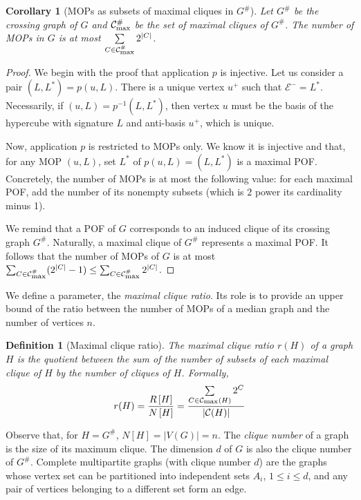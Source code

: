 \documentclass{article}
\newtheorem{definition}{Definition}
\newtheorem{corollary}{Corollary}
\newcommand{\card}[1]{\left| #1 \right|}
\newcommand{\mcalc}{\mathcal{C}}
\newcommand{\mcalcm}{\mathcal{C}_{\mbox{\scriptsize{max}}}}
\begin{document}
\begin{corollary}[MOPs as subsets of maximal cliques in $G^{\#}$]
Let $G^{\#}$ be the crossing graph of $G$ and $\mcalcm^{\#}$ be the set of maximal cliques of $G^{\#}$. The number of MOPs in $G$ is at most $\sum\limits_{C \in \mcalcm^{\#}} 2^{\card{C}}$. 
\label{co:mop_crossing}
\end{corollary}
\begin{proof}
We begin with the proof that application $p$ is injective. Let us consider a pair $(L,L^*) = p(u,L)$. There is a unique vertex $u^+$ such that $\mathcal{E}^- = L^*$. Necessarily, if $(u,L) = p^{-1}(L,L^*)$, then vertex $u$ must be the basis of the hypercube with signature $L$ and anti-basis $u^+$, which is unique.

Now, application $p$ is restricted to MOPs only. We know it is injective and that, for any MOP $(u,L)$, set $L^*$ of $p(u,L) = (L,L^*)$ is a maximal POF. Concretely, the number of MOPs is at most the following value: for each maximal POF, add the number of its nonempty subsets (which is $2$ power its cardinality minus 1).

We remind that a POF of $G$ corresponds to an induced clique of its crossing graph $G^{\#}$. Naturally, a maximal clique of $G^{\#}$ represents a maximal POF. It follows that the number of MOPs of $G$ is at most $\sum_{C \in \mcalcm^{\#}} (2^{\card{C}} - 1) \le \sum_{C \in \mcalcm^{\#}} 2^{\card{C}}$.
\end{proof}

We define a parameter, the \textit{maximal clique ratio}. Its role is to provide an upper bound of the ratio between the number of MOPs of a median graph and the number of vertices $n$.

\begin{definition}[Maximal clique ratio]
The maximal clique ratio $r(H)$ of a graph $H$ is the quotient between the sum of the number of subsets of each maximal clique of $H$ by the number of cliques of $H$. Formally,
\[
r(H) = \frac{R\left[ H\right]}{N\left[ H\right]} = \frac{\sum\limits_{C \in \mcalcm(H)} 2^{C}}{\card{\mcalc(H)}}
\]
\end{definition}

Observe that, for $H = G^{\#}$, $N\left[H\right] = \card{V(G)} = n$. The \textit{clique number} of a graph is the size of its maximum clique. The dimension $d$ of $G$ is also the clique number of $G^{\#}$. Complete multipartite graphs (with clique number $d$) are the graphs whose vertex set can be partitioned into independent sets $A_i$, $1\le i\le d$, and any pair of vertices belonging to a different set form an edge.
\end{document}
